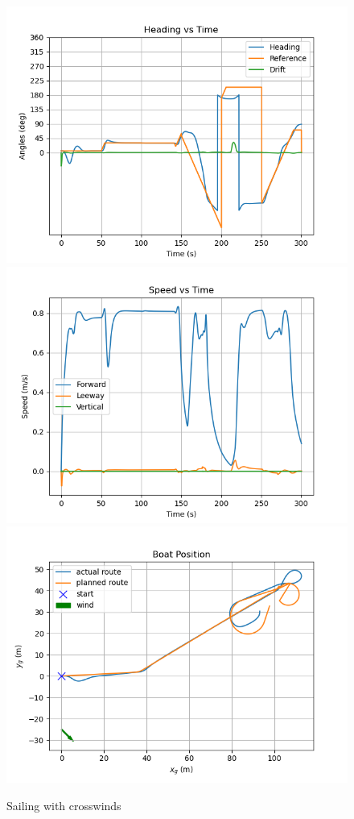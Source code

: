 \documentclass[conference]{IEEEtran}
\begin{document}
\begin{figure}
    \centering
\includegraphics[trim={0.5cm 0.25cm 1.25cm 0.75cm },clip]{documents/final_pres_figs/right_to_wind_to_40_40_heading.png}
         \includegraphics[trim={0.5cm 0.25cm 1.25cm 0.75cm },clip]{documents/final_pres_figs/right_to_wind_to_40_40_speed.png}
                  \includegraphics[trim={0.5cm 0.25cm 1.25cm 0.75cm },clip]{documents/final_pres_figs/right_to_wind_to_40_40_pos.png}
    \caption{Sailing with crosswinds}
    \label{fig:right_wind_pos}
\end{figure}
\end{document}
